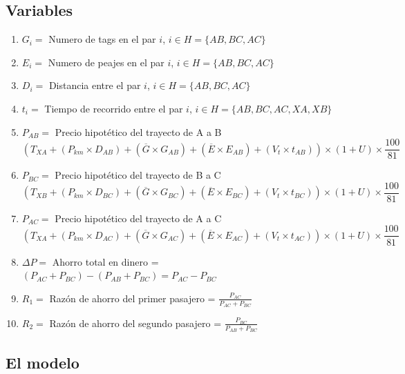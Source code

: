 \documentclass[12pt]{report}
\begin{document}
\subsection*{Variables}
\begin{enumerate}
    
    \item $G_{i}=$ Numero de tags en el par $i$, $i \in H = \{ AB, BC, AC \}$
    
    \item $E_{i}=$ Numero de peajes en el par $i$, $i \in H = \{ AB, BC, AC \}$
    
    \item $D_{i}=$ Distancia entre el par $i$, $i \in H = \{ AB, BC, AC \}$
    
    \item $t_{i}=$ Tiempo de recorrido entre el par $i$, $i \in H = \{ AB, BC, AC, XA, XB \}$
    
    \item $P_{AB}=$ Precio hipotético del trayecto de A a B  $$(T_{XA}+(P_{km} \times D_{AB})+(\overline{G} \times G_{AB})+(\overline{E} \times E_{AB})+(V_{t} \times t_{AB}))\times (1+U) \times \frac{100}{81}$$ 
    
    \item $P_{BC}=$ Precio hipotético del trayecto de B a C  $$(T_{XB}+(P_{km} \times D_{BC})+(\overline{G} \times G_{BC})+(\overline{E} \times E_{BC})+(V_{t} \times t_{BC}))\times (1+U) \times \frac{100}{81}$$ 
    
    \item $P_{AC}=$ Precio hipotético del trayecto de A a C  $$(T_{XA}+(P_{km} \times D_{AC})+(\overline{G} \times G_{AC})+(\overline{E} \times E_{AC})+(V_{t} \times t_{AC}))\times (1+U) \times \frac{100}{81}$$ 
    
    \item $\Delta P=$ Ahorro total en dinero = $(P_{AC}+P_{BC})-(P_{AB}+P_{BC}) = P_{AC}-P_{BC}$
    \item $R_{1}=$ Razón de ahorro del primer pasajero = $\frac{P_{AC}}{P_{AC}+P_{BC}}$
    \item $R_{2}=$ Razón de ahorro del segundo pasajero = $\frac{P_{BC}}{P_{AB}+P_{BC}}$
\end{enumerate}

\subsection*{El modelo}
\end{document}
